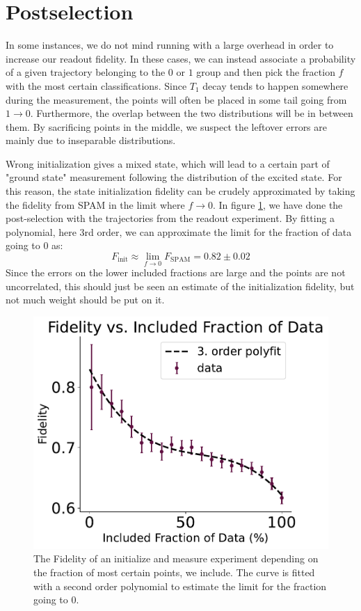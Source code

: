 \section{Postselection}\label{sec:postselection}
In some instances, we do not mind running with a large overhead in order to increase our readout fidelity. In these cases, we can instead associate a probability of a given trajectory belonging to the $0$ or $1$ group and then pick the fraction $f$ with the most certain classifications. Since $T_1$ decay tends to happen somewhere during the measurement, the points will often be placed in some tail going from $1 \to 0$. Furthermore, the overlap between the two distributions will be in between them. By sacrificing points in the middle, we suspect the leftover errors are mainly due to inseparable distributions. 

Wrong initialization gives a mixed state, which will lead to a certain part of "ground state" measurement following the distribution of the excited state. For this reason, the state initialization fidelity can be crudely approximated by taking the fidelity from SPAM in the limit where $f\to 0$. In figure \ref{fig:postselection_plot}, we have done the post-selection with the trajectories from the readout experiment. By fitting a polynomial, here 3rd order, we can approximate the limit for the fraction of data going to 0 as:
\begin{equation}
    F_{\text{init}} \approx \lim_{f \to 0} F_{\text{SPAM}} = 0.82 \pm 0.02
\end{equation}
Since the errors on the lower included fractions are large and the points are not uncorrelated, this should just be seen an estimate of the initialization fidelity, but  not much weight should be put on it. 


\begin{figure}[b]
    \centering
    \includegraphics[width = 0.70 \textwidth]{Readout/Figs/fidelity_vs_included_fraction.pdf}
    \caption{The Fidelity of an initialize and measure experiment depending on the fraction of most certain points, we include. The curve is fitted with a second order polynomial to estimate the limit for the fraction going to $0$.}
    \label{fig:postselection_plot}
\end{figure}

